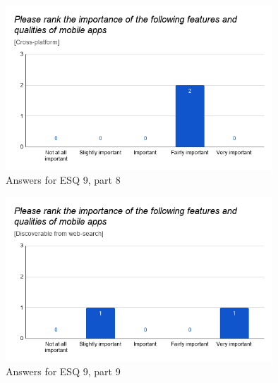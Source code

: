 \documentclass[a4paper,12pt]{article}
\begin{document}
\begin{figure}[ht!]
    \centering
    \includegraphics[width=10cm]{img/Results/esq9_8.png}
    \caption{Answers for ESQ 9, part 8}
    \label{fig:res_eduq9_8}
\end{figure}

\begin{figure}[ht!]
    \centering
    \includegraphics[width=10cm]{img/Results/esq9_9.png}
    \caption{Answers for ESQ 9, part 9}
    \label{fig:res_eduq9_9}
\end{figure}
\end{document}
